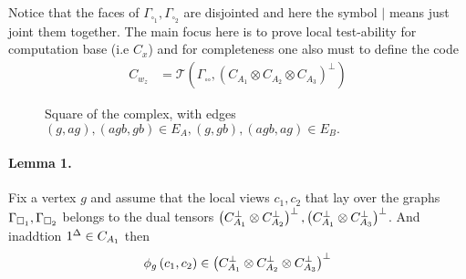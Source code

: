 \documentclass{article}
\begin{document}
\begin{multicols*}{2}
	Notice that the faces of $\Gamma_{\square_{1}},\Gamma_{\square_{2}}$ are disjointed and here the symbol $|$ means just joint them together. 
	The main focus here is to prove local test-ability for computation base (i.e $C_{x}$) and for completeness one also must to define the code 
	\begin{equation*}
	  \begin{split}
	    C_{w_{z}} &=  \mathcal{T}\left( \Gamma_{\square \square}, \left(  C_{A_1} \otimes C_{A_2} \otimes C_{A_3} \right)^{\perp}  \right)   
	  \end{split}
	\end{equation*}
\begin{figure}[H]
\begin{center}
\end{center}
\caption{Square of the complex, with edges $(g,ag), (agb, gb) \in E_A,
(g,gb), (agb, ag) \in E_B.$ \label{fig:square}
}
\end{figure}

\paragraph{Lemma 1.} Fix a vertex $g$ and assume that the local views $c_1,c_2$ that lay over the graphs $\Gamma_{\square_{1}}, \Gamma_{\square_{2}}$ belongs to the dual tensors $\left( C_{A_{1}}^{\perp} \otimes C_{A_{2}}^{\perp} \right)^\perp, \left( C_{A_{1}}^{\perp} \otimes C_{A_{3}}^{\perp} \right)^\perp$. And inaddtion $ 1^{\Delta} \in C_{A_{1}} $ then 
      \begin{equation*}
      \phi_{g}\left( c_1, c_2 \right) \in \left( C_{A_{1}}^{\perp} \otimes C_{A_{2}}^{\perp} \otimes C_{A_{3}}^{\perp} \right)^\perp
    \end{equation*}

\end{multicols*}
\end{document}
